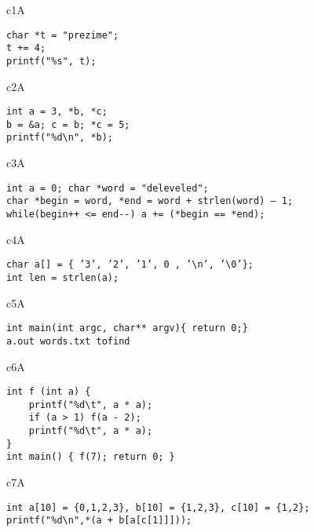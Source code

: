 
\begin{chunk}{c1A}
\begin{verbatim}
char *t = "prezime";
t += 4;
printf("%s", t);
\end{verbatim}
\end{chunk}

\begin{chunk}{c2A}
\begin{verbatim}
int a = 3, *b, *c;
b = &a; c = b; *c = 5;
printf("%d\n", *b);
\end{verbatim}
\end{chunk}

\begin{chunk}{c3A}
\begin{verbatim}
int a = 0; char *word = "deleveled";
char *begin = word, *end = word + strlen(word) – 1;
while(begin++ <= end--) a += (*begin == *end);
\end{verbatim}
\end{chunk}

\begin{chunk}{c4A}
\begin{verbatim}
char a[] = { ’3’, ’2’, ’1’, 0 , ’\n’, ’\0’};
int len = strlen(a);
\end{verbatim}
\end{chunk}

\begin{chunk}{c5A}
\begin{verbatim}
int main(int argc, char** argv){ return 0;}
a.out words.txt tofind
\end{verbatim}
\end{chunk}

\begin{chunk}{c6A}
\begin{verbatim}
int f (int a) {   
    printf("%d\t", a * a);
    if (a > 1) f(a - 2);
    printf("%d\t", a * a);    
}
int main() { f(7); return 0; }
\end{verbatim}
\end{chunk}

\begin{chunk}{c7A}
\begin{verbatim}
int a[10] = {0,1,2,3}, b[10] = {1,2,3}, c[10] = {1,2};
printf("%d\n",*(a + b[a[c[1]]]));
\end{verbatim}
\end{chunk}